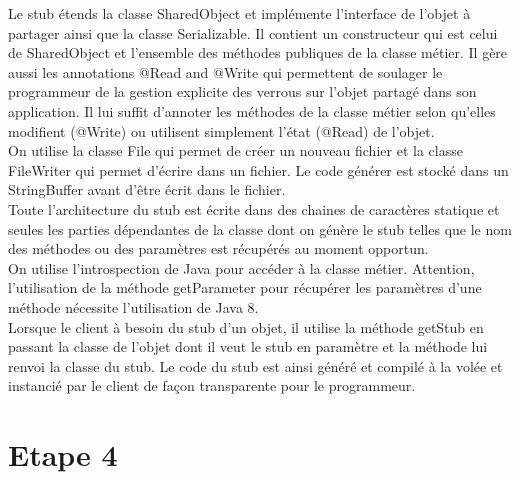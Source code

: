 \documentclass[a4paper,12pt]{article}
\begin{document}
Le stub étends la classe SharedObject et implémente l'interface de l'objet à partager ainsi que la classe Serializable.
Il contient un constructeur qui est celui de SharedObject et l'ensemble des méthodes publiques de la classe métier.
Il gère aussi les annotations @Read and @Write qui permettent de soulager le programmeur de la gestion explicite des verrous sur l'objet partagé dans son application. Il lui suffit d'annoter les méthodes de la classe métier selon qu'elles modifient (@Write) ou utilisent simplement l'état (@Read) de l'objet. \\

On utilise la classe File qui permet de créer un nouveau fichier et la classe FileWriter qui permet d'écrire dans un fichier. Le code générer est stocké dans un StringBuffer avant d'être écrit dans le fichier.\\
Toute l'architecture du stub est écrite dans des chaines de caractères statique et seules les parties dépendantes de la classe dont on génère le stub telles que le nom des méthodes ou des paramètres est récupérés au moment opportun.\\
 On utilise l'introspection de Java pour accéder à la classe métier. Attention, l'utilisation de la méthode getParameter pour récupérer les paramètres d'une méthode nécessite l'utilisation de Java 8.\\

Lorsque le client à besoin du stub d'un objet, il utilise la méthode getStub en passant la classe de l'objet dont il veut le stub en paramètre et la méthode lui renvoi la classe du stub. Le code du stub est ainsi généré et compilé à la volée et instancié par le client de façon transparente pour le programmeur.

\clearpage
\section{Etape 4}
\end{document}
